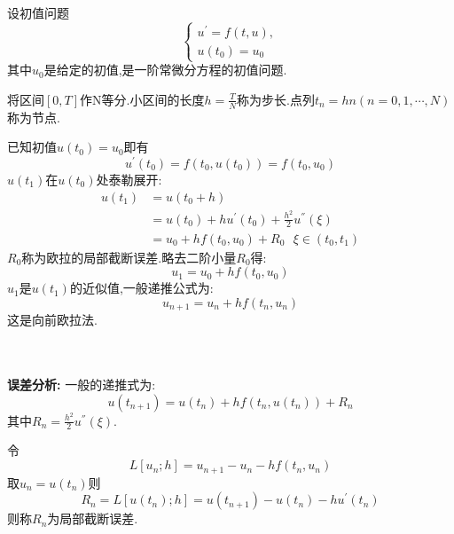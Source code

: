 \documentclass{article}
\begin{document}
\begin{CJK}{UTF8}{gkai}
设初值问题
\begin{equation*}
\begin{cases}
u^{'}=f(t,u),\\
u(t_{0})=u_{0}
\end{cases}
\end{equation*}
其中$u_{0}$是给定的初值,是一阶常微分方程的初值问题.

将区间$[0,T]$作N等分.小区间的长度$h=\frac{T}{N}$称为步长.点列$t_{n}=hn(n=0,1,\cdots,N)$称为节点.

已知初值$u(t_{0})=u_{0}$即有
\begin{equation}
u^{'}(t_{0})=f(t_{0},u(t_{0}))=f(t_{0},u_{0})
\end{equation}
$u(t_{1})$在$u(t_{0})$处泰勒展开:
\begin{align}
u(t_{1})&=u(t_{0}+h)\\&=u(t_{0})+hu^{'}(t_{0})+\frac{h^2}{2}u^{''}(\xi)\\&=u_{0}+hf(t_{0},u_{0})+R_{0}~~~\xi\in (t_{0},t_{1})
\end{align}
$R_{0}$称为欧拉的局部截断误差.略去二阶小量$R_{0}$得:
\begin{equation}
u_{1}=u_{0}+hf(t_{0},u_{0})
\end{equation}
$u_{1}$是$u(t_{1})$的近似值,一般递推公式为:
\begin{equation}
u_{n+1}=u_{n}+hf(t_{n},u_{n})
\label{1}
\end{equation}
这是向前欧拉法.
~\\
~\\
~\\
\par 
\textbf{误差分析:}
一般的递推式为:
\begin{equation}
u(t_{n+1})=u(t_{n})+hf(t_{n},u(t_{n}))+R_{n}
\label{2}
\end{equation}
其中$R_{n}=\frac{h^2}{2}u^{''}(\xi)$.

令
\begin{equation}
L[u_{n};h]=u_{n+1}-u_{n}-hf(t_{n},u_{n})
\end{equation}
取$u_{n}=u(t_{n})$则
\begin{equation}
R_{n}=L[u(t_{n});h]=u(t_{n+1})-u(t_{n})-hu^{'}(t_{n})
\end{equation}
则称$R_{n}$为局部截断误差.


\end{CJK}
\end{document}
